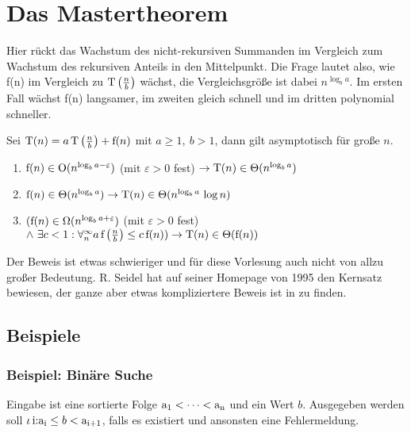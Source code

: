 \documentclass{scrreprt}%
\theoremstyle{break}
\begin{document}
\section{Das Mastertheorem}
Hier rückt das Wachstum des nicht-rekursiven Summanden im Vergleich zum Wachstum des rekursiven Anteils in den Mittelpunkt. Die Frage
lautet also, wie f(n) im Vergleich zu \(\textup{T}\left(\frac{n}{b}\right)\) wächst, die Vergleichsgröße ist dabei \(n^{\log_ba}\).
Im ersten Fall wächst f(n) langsamer, im zweiten gleich schnell und im dritten polynomial schneller.

Sei \(\textup{T}(n)=a\,\textup{T}\left(\frac{n}{b}\right)+\textup{f}(n)\) mit \( a \geq 1,\ b > 1\), 
dann gilt asymptotisch für große $n$.

\begin{enumerate}
\item \(\textup{f}(n) \in \textup{O}(n^{\log_ba-\varepsilon} ) \) (mit \(\varepsilon > 0\) fest) \(\rightarrow \textup{T}(n) \in\Theta(n^{\log_ba})\)

\item \(\textup{f}(n) \in\Theta(n^{\log_ba}) \rightarrow \textup{T}(n) \in\Theta(n^{\log_ba}\, \log n)\)

\item \((\textup{f}(n) \in\Omega(n^{\log_ba+\varepsilon} ) \) (mit \( \varepsilon > 0 \) fest)
\(\wedge\ \exists c < 1 : \forall^{\infty}_{n}
a \, \textup{f}\left(\frac{n}{b}\right)  \leq c \, \textup{f}(n)) \rightarrow \textup{T}(n) \in \Theta(\textup{f}(n))\)
\end{enumerate}

Der Beweis ist etwas schwieriger und für diese Vorlesung auch nicht von allzu großer Bedeutung. R. Seidel hat auf seiner Homepage
von 1995 den Kernsatz bewiesen, der ganze aber etwas kompliziertere Beweis ist in \cite{cormen} zu finden. 

\subsection{Beispiele}
\subsubsection{Beispiel: Binäre Suche} 

Eingabe ist eine sortierte Folge \(\textup{a}_1 < \dots < \textup{a}_{\textup{n}}\) und ein Wert $b$. Ausgegeben werden soll
\(\iota \, \textup{i:a}_{\textup{i}} \leq b < \textup{a}_{\textup{i+1}}\), falls es existiert und ansonsten eine Fehlermeldung.
\bigskip
\end{document}
